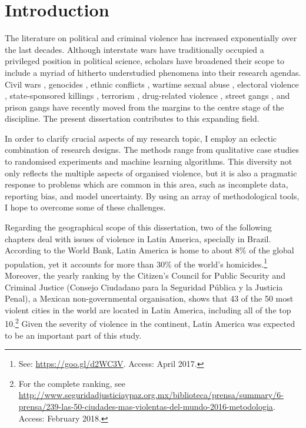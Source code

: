 \chapter{Introduction}
\label{chap:intro}

The literature on political and criminal violence has increased exponentially over the last decades. Although interstate wars have traditionally occupied a privileged position in political science, scholars have broadened their scope to include a myriad of hitherto understudied phenomena into their research agendas. Civil wars \citep{collier2004greed,fearon2003ethnicity,kalyvas2006logic}, genocides \citep{mamdani2014victims, power2013problem}, ethnic conflicts \citep{kaufmann1996possible, montalvo2005ethnic, sambanis2001ethnic}, wartime sexual abuse \citep{cohen2013explaining,wood2006variation,wood2009armed}, electoral violence \citep{hoglund2009electoral,wilkinson2006votes}, state-sponsored killings \citep{harff1988toward, krain1997state,krain2005international,uzonyi2014unpacking}, terrorism \citep{de2005quality,bueno2007propaganda,pape2003strategic}, drug-related violence \citep{holmes2006drugs,lessing2015logics,richani2013systems, shirk2010drug}, street gangs \citep{franzese2016youth,jones2009youth,rodgers2006living,sobel1987direct}, and prison gangs \citep{dias2011pulverizaccao,freire2014,skarbek2011governance,skarbek2012prison,skarbek2014social} have recently moved from the margins to the centre stage of the discipline. The present dissertation contributes to this expanding field.

In order to clarify crucial aspects of my research topic, I employ an eclectic combination of research designs. The methods range from qualitative case studies to randomised experiments and machine learning algorithms. This diversity not only reflects the multiple aspects of organised violence, but it is also a pragmatic response to problems which are common in this area, such as incomplete data, reporting bias, and model uncertainty. By using an array of methodological tools, I hope to overcome some of these challenges.

Regarding the geographical scope of this dissertation, two of the following chapters deal with issues of violence in Latin America, specially in Brazil. According to the World Bank, Latin America is home to about 8\% of the global population, yet it accounts for more than 30\% of the world's homicides.\footnote{See: \url{https://goo.gl/d2WC3V}. Access: April 2017.} Moreover, the yearly ranking by the Citizen's Council for Public Security and Criminal Justice (Consejo Ciudadano para la Seguridad Pública y la Justicia Penal), a Mexican non-governmental organisation, shows that 43 of the 50 most violent cities in the world are located in Latin America, including all of the top 10.\footnote{For the complete ranking, see \url{http://www.seguridadjusticiaypaz.org.mx/biblioteca/prensa/summary/6-prensa/239-las-50-ciudades-mas-violentas-del-mundo-2016-metodologia}. Access: February 2018.} Given the severity of violence in the continent, Latin America was expected to be an important part of this study.

